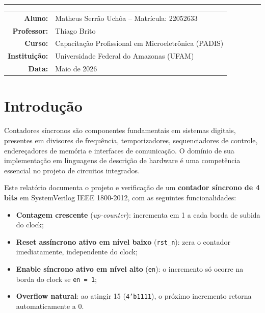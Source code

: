 \documentclass[12pt,a4paper]{article}
\begin{document}
\begin{titlepage}
  \vspace{0.8cm}
  \textcolor{cinzaborda}{\rule{\linewidth}{0.6pt}}
  \vspace{0.8cm}

  \begin{tabular}{rl}
    \textbf{Aluno:} & Matheus Serrão Uchôa -- Matrícula: 22052633 \\[4pt]
    \textbf{Professor:} & Thiago Brito \\[4pt]
    \textbf{Curso:} & Capacitação Profissional em Microeletrônica (PADIS) \\[4pt]
    \textbf{Instituição:} & Universidade Federal do Amazonas (UFAM) \\[4pt]
    \textbf{Data:} & Maio de 2026
  \end{tabular}
\end{titlepage}

\tableofcontents
\newpage

\section{Introdução}

Contadores síncronos são componentes fundamentais em sistemas digitais, presentes
em divisores de frequência, temporizadores, sequenciadores de controle, endereçadores
de memória e interfaces de comunicação. O domínio de sua implementação em linguagens
de descrição de hardware é uma competência essencial no projeto de circuitos integrados.

Este relatório documenta o projeto e verificação de um \textbf{contador síncrono de
4 bits} em SystemVerilog IEEE 1800-2012, com as seguintes funcionalidades:

\begin{itemize}[leftmargin=1.5cm]
  \item \textbf{Contagem crescente} (\textit{up-counter}): incrementa em 1 a cada
        borda de subida do clock;
  \item \textbf{Reset assíncrono ativo em nível baixo} (\texttt{rst\_n}): zera o
        contador imediatamente, independente do clock;
  \item \textbf{Enable síncrono ativo em nível alto} (\texttt{en}): o incremento
        só ocorre na borda do clock se \texttt{en = 1};
  \item \textbf{Overflow natural}: ao atingir 15 (\texttt{4'b1111}), o próximo
        incremento retorna automaticamente a 0.
\end{itemize}
\end{document}
